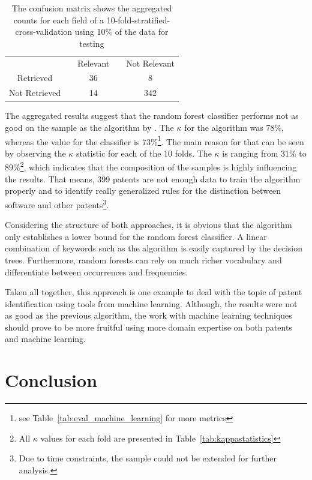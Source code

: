 \documentclass[12pt, a4paper]{scrartcl}
\newcommand{\ra}[1]{\renewcommand{\arraystretch}{#1}}
\theoremstyle{definition}
\begin{document}
\begin{table}[tb]\caption{The confusion matrix shows the aggregated counts for
each field of a 10-fold-stratified-cross-validation using 10\% of the data for
testing}\label{tab:confusion_ml_results}\centering\ra{1.3}
\begin{tabular}{@{}cp{0.5cm}cp{0.5cm}c@{}} \toprule
 & & Relevant & & Not Relevant\\ \cline{1-1} \cline{3-3} \cline{5-5}
Retrieved & & 36 & & 8\\
Not Retrieved & & 14 & & 342\\
\bottomrule
\end{tabular}
\end{table}

The aggregated results suggest that the random forest classifier performs not
as good on the sample as the algorithm by \citet{bessen2007empirical}. The
$\kappa$ for the algorithm was 78\%, whereas the value for the classifier is
73\%\footnote{see Table~\ref{tab:eval_machine_learning} for more metrics}. The
main reason for that can be seen by observing the $\kappa$ statistic for each
of the 10 folds. The $\kappa$ is ranging from 31\% to 89\%\footnote{All
$\kappa$ values for each fold are presented in
Table~\ref{tab:kappastatistics}}, which indicates that the composition of the
samples is highly influencing the results. That means, 399 patents are not
enough data to train the algorithm properly and to identify really generalized
rules for the distinction between software and other patents\footnote{Due to
time constraints, the sample could not be extended for further analysis.}.

Considering the structure of both approaches, it is obvious that the algorithm
only establishes a lower bound for the random forest classifier. A linear
combination of keywords such as the algorithm is easily captured by the
decision trees. Furthermore, random forests can rely on much richer vocabulary
and differentiate between occurrences and frequencies.

Taken all together, this approach is one example to deal with the topic of
patent identification using tools from machine learning. Although, the results
were not as good as the previous algorithm, the work with machine learning
techniques should prove to be more fruitful using more domain expertise on both
patents and machine learning.


\section{Conclusion} %
\label{sec:results}
\end{document}
